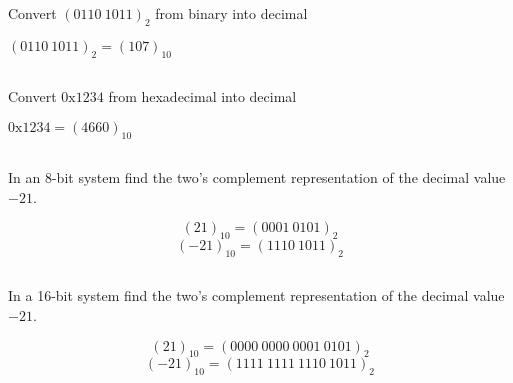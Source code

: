 \documentclass[paper=a4, fontsize=11pt]{scrartcl} %
\begin{document}
\subsection{}
\begin{fancyquotes}
  Convert ${(0110\ 1011)}_2$ from binary into decimal
\end{fancyquotes}

${(0110\ 1011)}_2 = {(107)}_{10}$

\subsection{}
\begin{fancyquotes}
  Convert $\mathrm{0x1234}$ from hexadecimal into decimal
\end{fancyquotes}

$\mathrm{0x1234} = {(4660)}_{10}$

\subsection{}
\begin{fancyquotes}
  In an 8-bit system find the two's complement representation of the
  decimal value $-21$.
\end{fancyquotes}

$${(21)}_{10}  = {(0001\ 0101)}_2$$
$${(-21)}_{10} = {(1110\ 1011)}_2$$

\subsection{}
\begin{fancyquotes}
  In a 16-bit system find the two's complement representation of the
  decimal value $-21$.
\end{fancyquotes}

$${(21)}_{10}  = {(0000\ 0000\ 0001\ 0101)}_2$$
$${(-21)}_{10} = {(1111\ 1111\ 1110\ 1011)}_2$$
\end{document}
